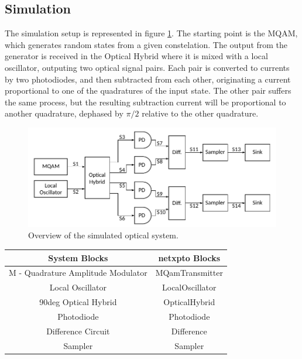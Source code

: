 \subsection*{Simulation}

The simulation setup is represented in figure \ref{fig:setup}. The starting point is the MQAM, which generates random states from a given constelation. The output from the generator is received in the Optical Hybrid where it is mixed with a local oscillator, outputing two optical signal pairs. Each pair is converted to currents by two photodiodes, and then subtracted from each other, originating a current proportional to one of the quadratures of the input state. 
The other pair suffers the same process, but the resulting subtraction current will be proportional to another quadrature, dephased by $\pi/2$ relative to the other quadrature.\\
%
\begin{figure}[H]
\centering
\includegraphics[width=\linewidth]{./sdf/quantum_noise/figures/scheme_setup.pdf}
\caption{Overview of the simulated optical system.}
\label{fig:setup}
\end{figure}
%
\begin{table}[H]
\centering
\begin{tabular}{c|c}
System Blocks                         & netxpto Blocks\\
\hline
M - Quadrature Amplitude Modulator    & MQamTransmitter\\
Local Oscillator                      & LocalOscillator\\
90deg Optical Hybrid                  & OpticalHybrid\\
Photodiode                            & Photodiode\\
Difference Circuit                    & Difference\\
Sampler                               & Sampler\\
\end{tabular}
\end{table}


